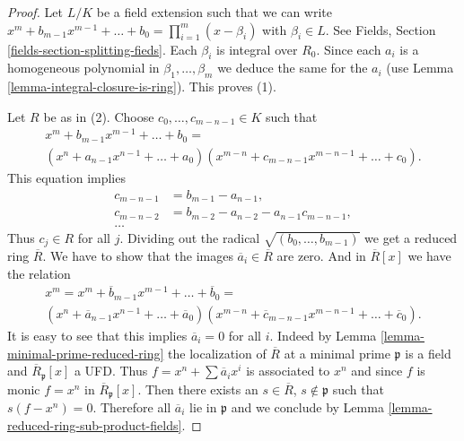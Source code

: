 \begin{proof}
Let $L/K$ be a field extension such that we can write
$x^m + b_{m - 1} x^{m - 1} + \ldots + b_0 =
\prod_{i = 1}^m (x - \beta_i)$ with $\beta_i \in L$.
See Fields, Section \ref{fields-section-splitting-fieds}.
Each $\beta_i$ is integral over $R_0$.
Since each $a_i$ is a homogeneous polynomial in $\beta_1, \ldots, \beta_m$
we deduce the same for the $a_i$
(use Lemma \ref{lemma-integral-closure-is-ring}). This proves (1).

\medskip\noindent
Let $R$ be as in (2). Choose $c_0, \ldots, c_{m - n - 1} \in K$ such that
$$
\begin{matrix}
x^m + b_{m - 1} x^{m - 1} + \ldots + b_0 =  \\
(x^n + a_{n - 1}x^{n - 1} + \ldots + a_0)
(x^{m - n} + c_{m - n - 1}x^{m - n - 1}+ \ldots + c_0).
\end{matrix}
$$
This equation implies
\begin{align*}
c_{m - n - 1} & = b_{m - 1} - a_{n - 1}, \\
c_{m - n - 2} & = b_{m - 2} - a_{n - 2} - a_{n - 1}c_{m - n - 1}, \\
\ldots
\end{align*}
Thus $c_j \in R$ for all $j$. Dividing out the radical
$\sqrt{(b_0, \ldots, b_{m - 1})}$ we get a reduced ring $\overline{R}$.
We have to show that the images $\overline{a}_i \in \overline{R}$
are zero. And in
$\overline{R}[x]$ we have the relation
$$
\begin{matrix}
x^m = x^m + \overline{b}_{m - 1} x^{m - 1} + \ldots + \overline{b}_0 = \\
(x^n + \overline{a}_{n - 1}x^{n - 1} + \ldots + \overline{a}_0)
(x^{m - n} + \overline{c}_{m - n - 1}x^{m - n - 1}+ \ldots + \overline{c}_0).
\end{matrix}
$$
It is easy to see that this implies $\overline{a}_i = 0$ for all $i$. Indeed
by Lemma \ref{lemma-minimal-prime-reduced-ring} the localization of
$\overline{R}$ at a minimal prime $\mathfrak{p}$ is a field and
$\overline{R}_{\mathfrak p}[x]$ a UFD. Thus
$f = x^n + \sum \overline{a}_i x^i$
is associated to $x^n$ and since $f$ is monic $f = x^n$
in $\overline{R}_{\mathfrak p}[x]$.
Then there exists an $s \in \overline{R}$, $s \not\in \mathfrak p$
such that $s(f - x^n) = 0$.  Therefore all $\overline{a}_i$ lie
in $\mathfrak p$ and we conclude by
Lemma \ref{lemma-reduced-ring-sub-product-fields}.
\end{proof}